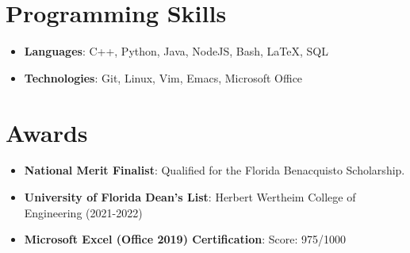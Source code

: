 \documentclass[letterpaper,11pt]{article}
\newcommand{\resumeItemSkills}[2]{
  \item\normalsize{
    \textbf{#1}{: #2 \vspace{-2pt}}
  }
}
\newcommand{\resumeSubItemSkills}[2]{\resumeItemSkills{#1}{#2}\vspace{-4pt}}
\newcommand{\resumeSubHeadingListStartSkillsAwards}{\begin{itemize}[leftmargin=*]}
\newcommand{\resumeSubHeadingListEnd}{\end{itemize}}
\begin{document}
\section{Programming Skills}
 \resumeSubHeadingListStartSkillsAwards
   \resumeSubItemSkills{Languages}{C++, Python, Java, NodeJS, Bash, LaTeX, SQL}
    \resumeSubItemSkills{Technologies}{Git, Linux, Vim, Emacs, Microsoft Office}
 \resumeSubHeadingListEnd

\section{Awards}
  \resumeSubHeadingListStartSkillsAwards
    \resumeSubItemSkills{National Merit Finalist}
      {Qualified for the Florida Benacquisto Scholarship.}
    \resumeSubItemSkills{University of Florida Dean's List}
      {Herbert Wertheim College of Engineering (2021-2022)}
    \resumeSubItemSkills{Microsoft Excel (Office 2019) Certification}{Score: 975/1000}
  \resumeSubHeadingListEnd
\end{document}
